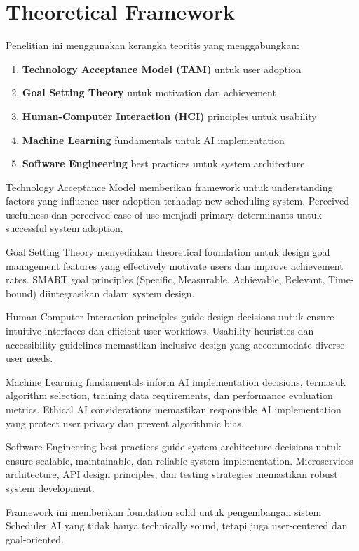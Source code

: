 \section{Theoretical Framework}

Penelitian ini menggunakan kerangka teoritis yang menggabungkan:

\begin{enumerate}
\item \textbf{Technology Acceptance Model (TAM)} untuk user adoption
\item \textbf{Goal Setting Theory} untuk motivation dan achievement
\item \textbf{Human-Computer Interaction (HCI)} principles untuk usability
\item \textbf{Machine Learning} fundamentals untuk AI implementation
\item \textbf{Software Engineering} best practices untuk system architecture
\end{enumerate}

Technology Acceptance Model memberikan framework untuk understanding factors yang influence user adoption terhadap new scheduling system. Perceived usefulness dan perceived ease of use menjadi primary determinants untuk successful system adoption.

Goal Setting Theory menyediakan theoretical foundation untuk design goal management features yang effectively motivate users dan improve achievement rates. SMART goal principles (Specific, Measurable, Achievable, Relevant, Time-bound) diintegrasikan dalam system design.

Human-Computer Interaction principles guide design decisions untuk ensure intuitive interfaces dan efficient user workflows. Usability heuristics dan accessibility guidelines memastikan inclusive design yang accommodate diverse user needs.

Machine Learning fundamentals inform AI implementation decisions, termasuk algorithm selection, training data requirements, dan performance evaluation metrics. Ethical AI considerations memastikan responsible AI implementation yang protect user privacy dan prevent algorithmic bias.

Software Engineering best practices guide system architecture decisions untuk ensure scalable, maintainable, dan reliable system implementation. Microservices architecture, API design principles, dan testing strategies memastikan robust system development.

Framework ini memberikan foundation solid untuk pengembangan sistem Scheduler AI yang tidak hanya technically sound, tetapi juga user-centered dan goal-oriented.